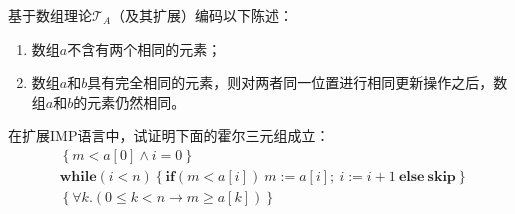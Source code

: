 \documentclass[11pt,a4paper]{article}
\begin{document}
\newpage
{}
\subproblem 基于数组理论$\mathcal{T}_A$（及其扩展）编码以下陈述：
\begin{enumerate}
    \item 数组$a$不含有两个相同的元素；
    \item 数组$a$和$b$具有完全相同的元素，则对两者同一位置进行相同更新操作之后，数组$a$和$b$的元素仍然相同。
\end{enumerate}

\begin{solution}
\end{solution}

\subproblem 在扩展IMP语言中，试证明下面的霍尔三元组成立：
\begin{align*}
    &\left\{m < a[0] \wedge i = 0\right\}\ \\
    &\textbf{while}(i < n)\left\{
        \textbf{if}(m < a[i])\ m := a[i];\ i := i + 1\ \textbf{else}\ \textbf{skip}
    \right\}\ \\
    &\left\{\forall k. \left(0\le k < n \rightarrow m \ge a[k]\right)\right\}
\end{align*}
\begin{solution}
\end{solution}
\end{document}
